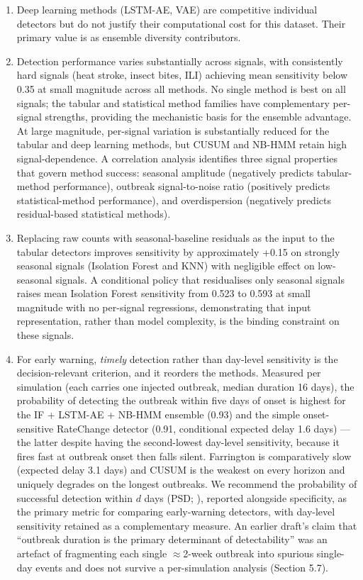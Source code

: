 \documentclass[11pt]{article}
\begin{document}
\begin{enumerate}
\item Deep learning methods (LSTM-AE, VAE) are competitive individual detectors but do not justify their computational cost for this dataset. Their primary value is as ensemble diversity contributors.

\item Detection performance varies substantially across signals, with consistently hard signals (heat stroke, insect bites, ILI) achieving mean sensitivity below 0.35 at small magnitude across all methods. No single method is best on all signals; the tabular and statistical method families have complementary per-signal strengths, providing the mechanistic basis for the ensemble advantage. At large magnitude, per-signal variation is substantially reduced for the tabular and deep learning methods, but CUSUM and NB-HMM retain high signal-dependence. A correlation analysis identifies three signal properties that govern method success: seasonal amplitude (negatively predicts tabular-method performance), outbreak signal-to-noise ratio (positively predicts statistical-method performance), and overdispersion (negatively predicts residual-based statistical methods).

\item Replacing raw counts with seasonal-baseline residuals as the input to the tabular detectors improves sensitivity by approximately +0.15 on strongly seasonal signals (Isolation Forest and KNN) with negligible effect on low-seasonal signals. A conditional policy that residualises only seasonal signals raises mean Isolation Forest sensitivity from 0.523 to 0.593 at small magnitude with no per-signal regressions, demonstrating that input representation, rather than model complexity, is the binding constraint on these signals.

\item For early warning, \textit{timely} detection rather than day-level sensitivity is the decision-relevant criterion, and it reorders the methods. Measured per simulation (each carries one injected outbreak, median duration 16 days), the probability of detecting the outbreak within five days of onset is highest for the IF + LSTM-AE + NB-HMM ensemble (0.93) and the simple onset-sensitive RateChange detector (0.91, conditional expected delay 1.6 days) --- the latter despite having the second-lowest day-level sensitivity, because it fires fast at outbreak onset then falls silent. Farrington is comparatively slow (expected delay 3.1 days) and CUSUM is the weakest on every horizon and uniquely degrades on the longest outbreaks. We recommend the probability of successful detection within $d$ days (PSD; \citealp{frisen2003}), reported alongside specificity, as the primary metric for comparing early-warning detectors, with day-level sensitivity retained as a complementary measure. An earlier draft's claim that ``outbreak duration is the primary determinant of detectability'' was an artefact of fragmenting each single $\approx$2-week outbreak into spurious single-day events and does not survive a per-simulation analysis (Section 5.7).
\end{enumerate}
\end{document}
